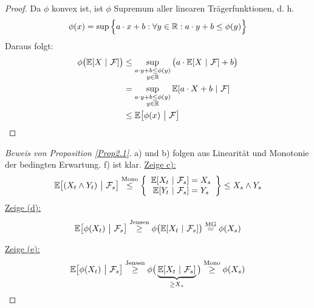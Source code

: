 \begin{proof}
	Da $\phi$ konvex ist, ist $\phi$ Supremum aller linearen Trägerfunktionen, d. h.
	\begin{align*}
		\phi(x)=\sup\Big\lbrace a\cdot x+b:\forall y\in \mathbb{R}: a\cdot y+b\leq\phi(y)\Big\rbrace
	\end{align*}
	Daraus folgt:
	\begin{align*}
		\phi\big(\mathbb{E}[X~|~\mathcal{F}]\big)
		&\leq\sup\limits_{\begin{subarray}{c}a\cdot y+b\leq\phi(y)\\y\in\mathbb{R}\end{subarray}}\big(a\cdot\mathbb{E}[X~|~\mathcal{F}]+b\big) \\
		&=\sup\limits_{\begin{subarray}{c}a\cdot y+b\leq\phi(y)\\y\in\mathbb{R}\end{subarray}}
		\mathbb{E}[a\cdot X+b~|~\mathcal{F}] \\
		&\leq \mathbb{E}\big[\phi(x)~\big|~\mathcal{F}\big]
	\end{align*}
\end{proof}

\begin{proof}[Beweis von Proposition \ref{Prop2.1}]
	a) und b) folgen aus Linearität und Monotonie der bedingten Erwartung. f) ist klar.\nl
	\underline{Zeige c):}
	\begin{align*}
		\mathbb{E}\big[(X_t\wedge Y_t)~\big|~\mathcal{F}_s\big]
		\stackrel{\text{Mono}}{\leq}
		\left\lbrace\begin{array}{c}
		\mathbb{E}[X_t~|~\mathcal{F}_s]=X_s\\
		\mathbb{E}[Y_t~|~\mathcal{F}_s]=Y_s\\
		\end{array}\right\rbrace
		\leq X_s\wedge Y_s
	\end{align*}
	\underline{Zeige (d):}
	\begin{align*}
		\mathbb{E}\big[\phi(X_t)~\big|~\mathcal{F}_s\big]
		\stackrel{\text{Jensen}}{\geq}
		\phi\big(\mathbb{E}[X_t~|~\mathcal{F}_s]\big)
		\stackrel{\text{MG}}{=}
		\phi(X_s)
	\end{align*}

	\underline{Zeige (e):}
	\begin{align*}
		\mathbb{E}\big[\phi(X_t)~\big|~\mathcal{F}_s\big]
		\stackrel{\text{Jensen}}{\geq}
		\phi\big(\underbrace{\mathbb{E}[X_t~|~\mathcal{F}_s]}_{\geq X_s}\big)
		\stackrel{\text{Mono}}{\geq}
		\phi(X_s)
	\end{align*}
\end{proof}


